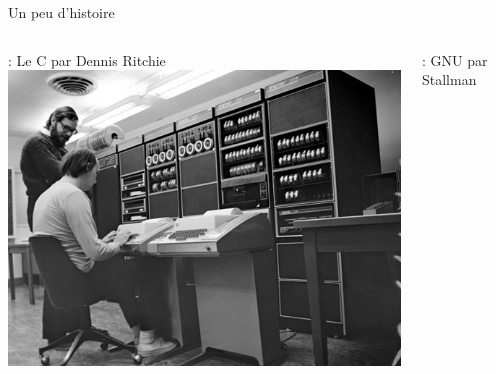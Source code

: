 \documentclass[12pt,t]{beamer}
\begin{document}
\begin{frame}{Un peu d'histoire}
    \vspace{30pt}

    \begin{columns}[onlytextwidth]
        \begin{column}{0.45\textwidth}
             : Le C par Dennis Ritchie \\
            \vspace{20pt}
            \includegraphics[scale=0.3]{ken-ritchie-1972.jpg}
        \end{column}
        \begin{column}{0.45\textwidth}
             : GNU par Stallman \\
            \vspace{20pt}

\end{column}
\end{columns}
\end{frame}
\end{document}
